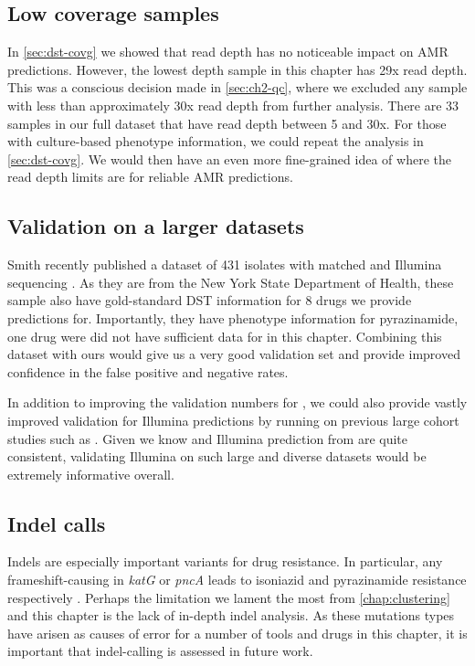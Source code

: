 \subsection{Low coverage samples}

In \autoref{sec:dst-covg} we showed that read depth has no noticeable impact on AMR predictions. However, the lowest depth sample in this chapter has 29x read depth. This was a conscious decision made in \autoref{sec:ch2-qc}, where we excluded any sample with less than approximately 30x read depth from further analysis. There are 33 samples in our full dataset that have \ont{} read depth between 5 and 30x. For those with culture-based phenotype information, we could repeat the analysis in \autoref{sec:dst-covg}. We would then have an even more fine-grained idea of where the \ont{} read depth limits are for reliable AMR predictions.

\subsection{Validation on a larger datasets}

Smith \etal{} recently published a dataset of 431 \mtb{} isolates with matched \ont{} and Illumina sequencing \cite{smith2020}. As they are from the New York State Department of Health, these sample also have gold-standard DST information for 8 drugs we provide predictions for. Importantly, they have phenotype information for pyrazinamide, one drug were did not have sufficient data for in this chapter. Combining this dataset with ours would give us a very good \ont{} validation set and provide improved confidence in the false positive and negative rates. 

In addition to improving the validation numbers for \ont{}, we could also provide vastly improved validation for \drprg{} Illumina predictions by running on previous large cohort studies such as \cite{cryptic2018,hunt2019,phelan2019}. Given we know \ont{} and Illumina prediction from \drprg{} are quite consistent, validating Illumina on such large and diverse datasets would be extremely informative overall.

\subsection{Indel calls}
\label{sec:indel-dst-fw}
Indels are especially important variants for \mtb{} drug resistance. In particular, any frameshift-causing in \textit{katG} or \textit{pncA} leads to isoniazid and pyrazinamide resistance respectively \cite{miotto2017}. Perhaps the limitation we lament the most from \autoref{chap:clustering} and this chapter is the lack of in-depth indel analysis. As these mutations types have arisen as causes of error for a number of tools and drugs in this chapter, it is important that indel-calling is assessed in future work.

